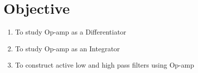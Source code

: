 \section{Objective}

\begin{enumerate}
    \item To study Op-amp as a Differentiator
    \item To study Op-amp as an Integrator
    \item To construct active low and high pass filters using Op-amp
\end{enumerate}